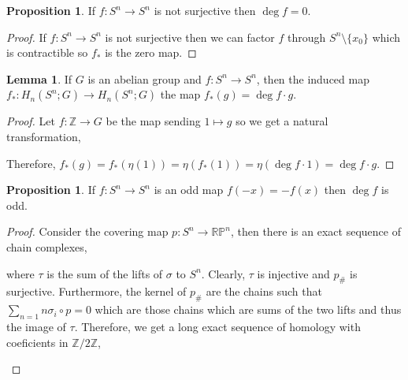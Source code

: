 \documentclass[12pt]{extarticle}
\newcommand{\Z}{\mathbb{Z}}
\newcommand{\rp}{\mathbb{RP}}
\theoremstyle{definition}
\newtheorem{lemma}[theorem]{Lemma}
\newtheorem{proposition}[theorem]{Proposition}
\begin{document}
\begin{proposition}
If $f : S^n \to S^n$ is not surjective then $\deg{f} = 0$. 
\end{proposition}

\begin{proof}
If $f : S^n \to S^n$ is not surjective then we can factor $f$ through $S^n \setminus \{x_0\}$ which is contractible so $f_*$ is the zero map. 
\end{proof}


\begin{lemma}
If $G$ is an abelian group and $f : S^n \to S^n$, then the induced map $f_* : H_n(S^n; G) \to H_n(S^n; G)$ the map $f_*(g) = \deg{f} \cdot g$. 
\end{lemma}

\begin{proof}
Let $f : \Z \to G$ be the map sending $1 \mapsto g$ so we get a natural transformation,
\begin{center}
\end{center}
Therefore, $f_*(g) = f_*(\eta(1)) = \eta(f_*(1)) = \eta( \deg{f} \cdot 1) = \deg{f} \cdot g$. 
\end{proof}

\begin{proposition}
If $f : S^n \to S^n$ is an odd map $f(-x) = - f(x)$ then $\deg{f}$ is odd. 
\end{proposition}

\begin{proof}
Consider the covering map $p : S^n \to \rp^n$, then there is an exact sequence of chain complexes,
\begin{center}
\end{center}
where $\tau$ is the sum of the lifts of $\sigma$ to $S^n$. Clearly, $\tau$ is injective and $p_{\#}$ is surjective. Furthermore, the kernel of $p_{\#}$ are the chains such that $\sum_{n = 1} n \sigma_i \circ p = 0$ which are those chains which are sums of the two lifts and thus the image of $\tau$. Therefore, we get a long exact sequence of homology with coeficients in $\Z / 2 \Z$,

\begin{center}
\end{center}
\end{proof}
\end{document}
